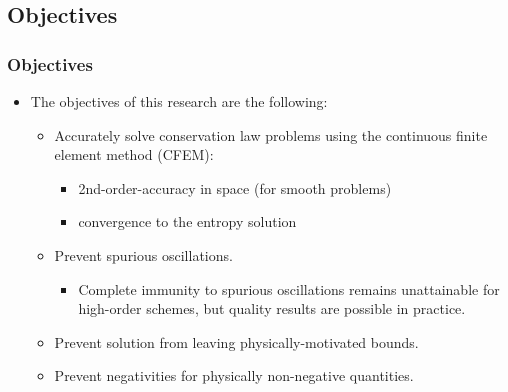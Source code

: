 \subsection{Objectives}
\begin{frame}
\frametitle{Objectives}

\begin{itemize}
   \item The objectives of this research are the following:
   \begin{itemize}
      \item \textcolor{secondarycolorheavy}{Accurately solve conservation law
        problems} using the continuous finite element method (CFEM):
      \begin{itemize}
        \item 2nd-order-accuracy in space (for smooth problems)
        \item convergence to the entropy solution
      \end{itemize}
      \item \textcolor{secondarycolorheavy}{Prevent spurious oscillations}.
      \begin{itemize}
	\item Complete immunity to spurious oscillations remains unattainable for
          high-order schemes, but quality results are possible in practice.
      \end{itemize}
      \item \textcolor{secondarycolorheavy}{Prevent solution from leaving
        physically-motivated bounds}.
      \item \textcolor{secondarycolorheavy}{Prevent negativities}
        for physically non-negative quantities.
   \end{itemize}
\end{itemize}

\end{frame}
